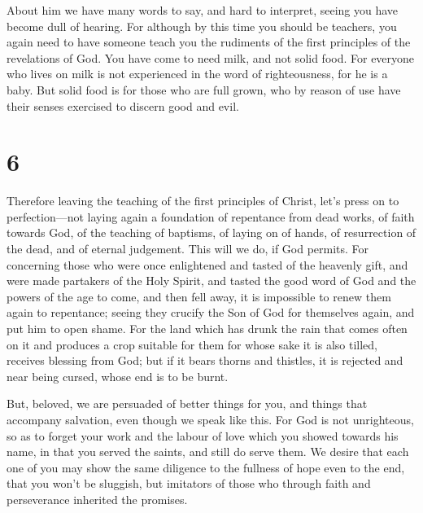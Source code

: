 About him we have many words to say, and hard to
interpret, seeing you have become dull of hearing.  For
although by this time you should be teachers, you again need to have
someone teach you the rudiments of the first principles of the
revelations of God. You have come to need milk, and not solid food.
 For everyone who lives on milk is not experienced in the
word of righteousness, for he is a baby.  But solid food
is for those who are full grown, who by reason of use have their senses
exercised to discern good and evil.

\hypertarget{section-5}{%
\section{6}\label{section-5}}

 Therefore leaving the teaching of the first principles of
Christ, let's press on to perfection---not laying again a foundation of
repentance from dead works, of faith towards God,  of the
teaching of baptisms, of laying on of hands, of resurrection of the
dead, and of eternal judgement.  This will we do, if God
permits.  For concerning those who were once enlightened
and tasted of the heavenly gift, and were made partakers of the Holy
Spirit,  and tasted the good word of God and the powers of
the age to come,  and then fell away, it is impossible to
renew them again to repentance; seeing they crucify the Son of God for
themselves again, and put him to open shame.  For the land
which has drunk the rain that comes often on it and produces a crop
suitable for them for whose sake it is also tilled, receives blessing
from God;  but if it bears thorns and thistles, it is
rejected and near being cursed, whose end is to be burnt.

 But, beloved, we are persuaded of better things for you,
and things that accompany salvation, even though we speak like this.
 For God is not unrighteous, so as to forget your work
and the labour of love which you showed towards his name, in that you
served the saints, and still do serve them.  We desire
that each one of you may show the same diligence to the fullness of hope
even to the end,  that you won't be sluggish, but
imitators of those who through faith and perseverance inherited the
promises.

